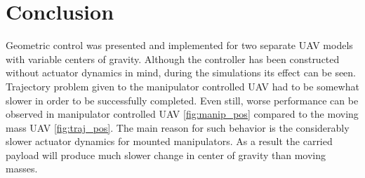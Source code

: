 \section{Conclusion}

Geometric control was presented and implemented for two separate UAV models with variable centers of gravity. Although the controller has been constructed without actuator dynamics in mind, during the simulations its effect can be seen. Trajectory problem given to the manipulator controlled UAV had to be somewhat slower in order to be successfully completed. Even still, worse performance can be observed in manipulator controlled UAV \ref{fig:manip_pos} compared to the moving mass UAV \ref{fig:traj_pos}. The main reason for such behavior is the considerably slower actuator dynamics for mounted manipulators. As a result the carried payload will produce much slower change in center of gravity than moving masses. \\